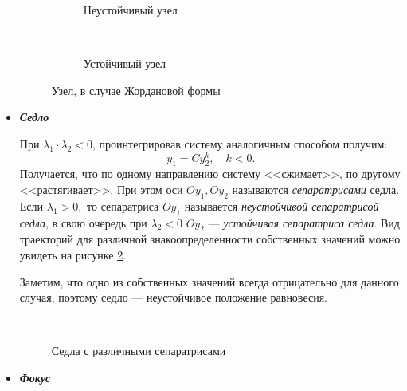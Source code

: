\begin{itemize}
\begin{figure}[h]
\end{figure}



\begin{figure}[h]
	\centering
	
	\begin{subfigure}[t]{0.4\textwidth}
	\caption{Неустойчивый узел}
	\end{subfigure}
	~ ~ ~ ~               
	\begin{subfigure}[t]{0.4\textwidth}
	\caption{Устойчивый узел}
	\end{subfigure}
	
	\caption{Узел, в случае Жордановой формы}\label{ch4node2}
\end{figure}


\item  \textbf{\textit{Седло}}

При $\lambda_1 \cdot \lambda_2 < 0$, проинтегрировав систему аналогичным способом получим:
$$
y_1 = C y_2^k, \quad k <0.
$$
Получается, что по одному направлению систему <<сжимает>>, по другому <<растягивает>>. При этом оси $Oy_1, Oy_2$ называются \textit{сепаратрисами} седла. Если $\lambda_1 > 0,$ то сепаратриса $Oy_1$ называется \textit{неустойчивой сепаратрисой седла}, в свою очередь при $\lambda_2 < 0$ $Oy_2$ --- \textit{устойчивая сепаратриса седла}.  Вид траекторий для различной знакоопределенности собственных значений можно увидеть на рисунке \ref{ch4saddle}.

Заметим, что одно из собственных значений всегда отрицательно для данного случая, поэтому седло --- неустойчивое положение равновесия.

\begin{figure}[h]
	\centering
	
	\begin{subfigure}[t]{0.4\textwidth}
	\end{subfigure}
	~ ~ ~ ~               
	\begin{subfigure}[t]{0.4\textwidth}
	\end{subfigure}
	
	\caption{Седла с различными сепаратрисами}\label{ch4saddle}
\end{figure}

\item  \textbf{\textit{Фокус}}


\end{itemize}
